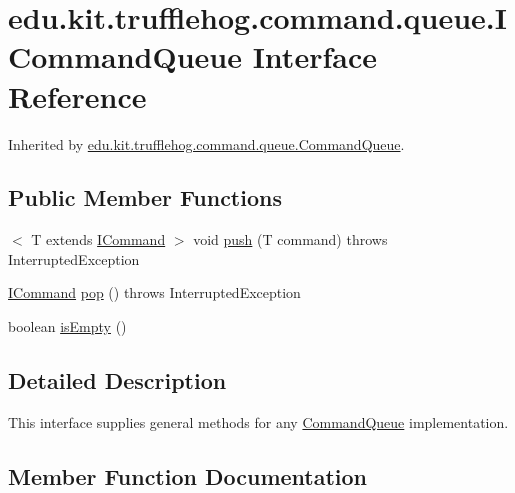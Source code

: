 \hypertarget{interfaceedu_1_1kit_1_1trufflehog_1_1command_1_1queue_1_1_i_command_queue}{}\section{edu.\+kit.\+trufflehog.\+command.\+queue.\+I\+Command\+Queue Interface Reference}
\label{interfaceedu_1_1kit_1_1trufflehog_1_1command_1_1queue_1_1_i_command_queue}


Inherited by \hyperlink{classedu_1_1kit_1_1trufflehog_1_1command_1_1queue_1_1_command_queue}{edu.\+kit.\+trufflehog.\+command.\+queue.\+Command\+Queue}.

\subsection*{Public Member Functions}
\begin{DoxyCompactItemize}
\item 
$<$ T extends \hyperlink{interfaceedu_1_1kit_1_1trufflehog_1_1command_1_1_i_command}{I\+Command} $>$ void \hyperlink{interfaceedu_1_1kit_1_1trufflehog_1_1command_1_1queue_1_1_i_command_queue_aa3b183fb2b7d8c6d4a53dd493e5e7e78}{push} (T command)  throws Interrupted\+Exception
\item 
\hyperlink{interfaceedu_1_1kit_1_1trufflehog_1_1command_1_1_i_command}{I\+Command} \hyperlink{interfaceedu_1_1kit_1_1trufflehog_1_1command_1_1queue_1_1_i_command_queue_a7f5d0222a8c92e15517638dee8a5dad3}{pop} ()  throws Interrupted\+Exception
\item 
boolean \hyperlink{interfaceedu_1_1kit_1_1trufflehog_1_1command_1_1queue_1_1_i_command_queue_a16bf5e5567d71d66e24563a7943122a3}{is\+Empty} ()
\end{DoxyCompactItemize}


\subsection{Detailed Description}
This interface supplies general methods for any \hyperlink{classedu_1_1kit_1_1trufflehog_1_1command_1_1queue_1_1_command_queue}{Command\+Queue} implementation. 

\subsection{Member Function Documentation}
\hypertarget{interfaceedu_1_1kit_1_1trufflehog_1_1command_1_1queue_1_1_i_command_queue_a16bf5e5567d71d66e24563a7943122a3}{}
